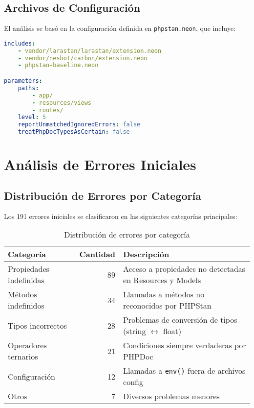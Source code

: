 \documentclass[12pt,a4paper]{article}
\begin{document}
\subsection{Archivos de Configuración}

El análisis se basó en la configuración definida en \texttt{phpstan.neon}, que incluye:

\begin{lstlisting}[language=yaml, caption=Configuración PHPStan]
includes:
    - vendor/larastan/larastan/extension.neon
    - vendor/nesbot/carbon/extension.neon
    - phpstan-baseline.neon

parameters:
    paths:
        - app/
        - resources/views
        - routes/
    level: 5
    reportUnmatchedIgnoredErrors: false
    treatPhpDocTypesAsCertain: false
\end{lstlisting}

\section{Análisis de Errores Iniciales}

\subsection{Distribución de Errores por Categoría}

Los 191 errores iniciales se clasificaron en las siguientes categorías principales:

\begin{table}[h]
\centering
\begin{tabular}{@{}lrp{6cm}@{}}
\toprule
\textbf{Categoría} & \textbf{Cantidad} & \textbf{Descripción} \\
\midrule
Propiedades indefinidas & 89 & Acceso a propiedades no detectadas en Resources y Models \\
Métodos indefinidos & 34 & Llamadas a métodos no reconocidos por PHPStan \\
Tipos incorrectos & 28 & Problemas de conversión de tipos (string $\leftrightarrow$ float) \\
Operadores ternarios & 21 & Condiciones siempre verdaderas por PHPDoc \\
Configuración & 12 & Llamadas a \texttt{env()} fuera de archivos config \\
Otros & 7 & Diversos problemas menores \\
\bottomrule
\end{tabular}
\caption{Distribución de errores por categoría}
\end{table}
\end{document}
